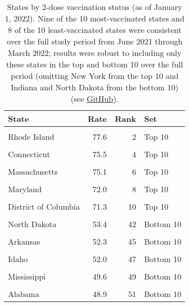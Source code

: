 \documentclass[
]{article}
\begin{document}
\begin{table}[H]

\caption{\label{tab:unnamed-chunk-1}States by 2-dose vaccination status (as of January 1, 2022). Nine of the 10 most-vaccinated states and 8 of the 10 least-vaccinated states were consistent over the full study period from June 2021 through March 2022; results were robust to including only these states in the top and bottom 10 over the full period (omitting New York from the top 10 and Indiana and North Dakota from the bottom 10) (see \href{https://github.com/abilinski/ExcessMortalityDeltaOmicron}{GitHub}).}
\centering
\begin{tabular}[t]{l|r|r|l}
\hline
State & Rate & Rank & Set\\
\hline
\cellcolor{gray!6}{Vermont} & \cellcolor{gray!6}{79.0} & \cellcolor{gray!6}{1} & \cellcolor{gray!6}{Top 10}\\
\hline
Rhode Island & 77.6 & 2 & Top 10\\
\hline
\cellcolor{gray!6}{Maine} & \cellcolor{gray!6}{77.0} & \cellcolor{gray!6}{3} & \cellcolor{gray!6}{Top 10}\\
\hline
Connecticut & 75.5 & 4 & Top 10\\
\hline
\cellcolor{gray!6}{Hawaii} & \cellcolor{gray!6}{75.3} & \cellcolor{gray!6}{5} & \cellcolor{gray!6}{Top 10}\\
\hline
Massachusetts & 75.1 & 6 & Top 10\\
\hline
\cellcolor{gray!6}{New York} & \cellcolor{gray!6}{72.7} & \cellcolor{gray!6}{7} & \cellcolor{gray!6}{Top 10}\\
\hline
Maryland & 72.0 & 8 & Top 10\\
\hline
\cellcolor{gray!6}{New Jersey} & \cellcolor{gray!6}{71.8} & \cellcolor{gray!6}{9} & \cellcolor{gray!6}{Top 10}\\
\hline
District of Columbia & 71.3 & 10 & Top 10\\
\hline
\cellcolor{gray!6}{Indiana} & \cellcolor{gray!6}{53.4} & \cellcolor{gray!6}{42} & \cellcolor{gray!6}{Bottom 10}\\
\hline
North Dakota & 53.4 & 42 & Bottom 10\\
\hline
\cellcolor{gray!6}{Tennessee} & \cellcolor{gray!6}{52.4} & \cellcolor{gray!6}{44} & \cellcolor{gray!6}{Bottom 10}\\
\hline
Arkansas & 52.3 & 45 & Bottom 10\\
\hline
\cellcolor{gray!6}{Georgia} & \cellcolor{gray!6}{52.2} & \cellcolor{gray!6}{46} & \cellcolor{gray!6}{Bottom 10}\\
\hline
Idaho & 52.0 & 47 & Bottom 10\\
\hline
\cellcolor{gray!6}{Louisiana} & \cellcolor{gray!6}{51.1} & \cellcolor{gray!6}{48} & \cellcolor{gray!6}{Bottom 10}\\
\hline
Mississippi & 49.6 & 49 & Bottom 10\\
\hline
\cellcolor{gray!6}{Wyoming} & \cellcolor{gray!6}{49.1} & \cellcolor{gray!6}{50} & \cellcolor{gray!6}{Bottom 10}\\
\hline
Alabama & 48.9 & 51 & Bottom 10\\
\hline
\end{tabular}
\end{table}
\end{document}
